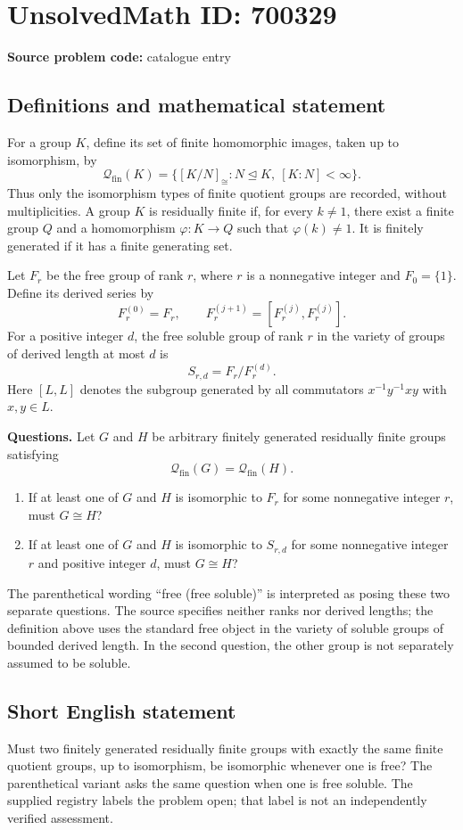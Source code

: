 \documentclass[11pt]{article}
\begin{document}
\section*{UnsolvedMath ID: 700329}
\textbf{Source problem code:} catalogue entry
\subsection{Definitions and mathematical statement}
For a group \(K\), define its set of finite homomorphic images, taken up to isomorphism, by
\[
\mathcal{Q}_{\mathrm{fin}}(K)=\{[K/N]_{\cong}:N\trianglelefteq K,\ [K:N]<\infty\}.
\]
Thus only the isomorphism types of finite quotient groups are recorded, without multiplicities. A group \(K\) is residually finite if, for every \(k\ne 1\), there exist a finite group \(Q\) and a homomorphism \(\varphi:K\to Q\) such that \(\varphi(k)\ne 1\). It is finitely generated if it has a finite generating set.

Let \(F_r\) be the free group of rank \(r\), where \(r\) is a nonnegative integer and \(F_0=\{1\}\). Define its derived series by
\[
F_r^{(0)}=F_r,\qquad F_r^{(j+1)}=[F_r^{(j)},F_r^{(j)}].
\]
For a positive integer \(d\), the free soluble group of rank \(r\) in the variety of groups of derived length at most \(d\) is
\[
S_{r,d}=F_r/F_r^{(d)}.
\]
Here \([L,L]\) denotes the subgroup generated by all commutators \(x^{-1}y^{-1}xy\) with \(x,y\in L\).

\textbf{Questions.} Let \(G\) and \(H\) be arbitrary finitely generated residually finite groups satisfying
\[
\mathcal{Q}_{\mathrm{fin}}(G)=\mathcal{Q}_{\mathrm{fin}}(H).
\]
\begin{enumerate}
\item If at least one of \(G\) and \(H\) is isomorphic to \(F_r\) for some nonnegative integer \(r\), must \(G\cong H\)?
\item If at least one of \(G\) and \(H\) is isomorphic to \(S_{r,d}\) for some nonnegative integer \(r\) and positive integer \(d\), must \(G\cong H\)?
\end{enumerate}
The parenthetical wording ``free (free soluble)'' is interpreted as posing these two separate questions. The source specifies neither ranks nor derived lengths; the definition above uses the standard free object in the variety of soluble groups of bounded derived length. In the second question, the other group is not separately assumed to be soluble.
\subsection{Short English statement}
Must two finitely generated residually finite groups with exactly the same finite quotient groups, up to isomorphism, be isomorphic whenever one is free? The parenthetical variant asks the same question when one is free soluble. The supplied registry labels the problem open; that label is not an independently verified assessment.
\end{document}
